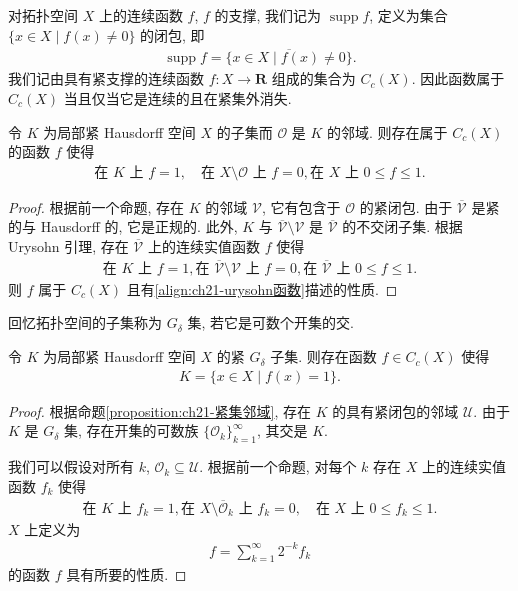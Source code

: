 \documentclass[../../main.tex]{subfiles}
\begin{document}
对拓扑空间 $X$ 上的连续函数 $f$, $f$ 的支撑, 我们记为 $\operatorname{supp}f$, 定义为集合 $\{x\in X\mid f(x)\neq 0\}$ 的闭包, 即
\begin{align*}
\operatorname{supp}f=\overline{\{x\in X\mid f(x)\neq 0\}}.
\end{align*}
我们记由具有紧支撑的连续函数 $f:X\to\mathbf{R}$ 组成的集合为 $C_{c}(X)$. 因此函数属于 $C_{c}(X)$ 当且仅当它是连续的且在紧集外消失.

\begin{proposition}\label{proposition:ch21-urysohn变体}
令 $K$ 为局部紧 Hausdorff 空间 $X$ 的子集而 $\mathcal{O}$ 是 $K$ 的邻域. 则存在属于 $C_{c}(X)$ 的函数 $f$ 使得
\begin{align}\label{align:ch21-urysohn函数}
\text{在 }K\text{ 上 }f=1,\quad\text{在 }X\setminus\mathcal{O}\text{ 上 }f=0,\text{在 }X\text{ 上 }0\leqslant f\leqslant 1.
\end{align}
\end{proposition}

\begin{proof}
根据前一个命题, 存在 $K$ 的邻域 $\mathcal{V}$, 它有包含于 $\mathcal{O}$ 的紧闭包. 由于 $\overline{\mathcal{V}}$ 是紧的与 Hausdorff 的, 它是正规的. 此外, $K$ 与 $\overline{\mathcal{V}}\setminus\mathcal{V}$ 是 $\overline{\mathcal{V}}$ 的不交闭子集. 根据 Urysohn 引理, 存在 $\overline{\mathcal{V}}$ 上的连续实值函数 $f$ 使得
\begin{align*}
\text{在 }K\text{ 上 }f=1,\text{在 }\overline{\mathcal{V}}\setminus\mathcal{V}\text{ 上 }f=0,\text{在 }\overline{\mathcal{V}}\text{ 上 }0\leqslant f\leqslant 1.
\end{align*}
则 $f$ 属于 $C_{c}(X)$ 且有\eqref{align:ch21-urysohn函数}描述的性质.
\end{proof}

回忆拓扑空间的子集称为 $G_{\delta}$ 集, 若它是可数个开集的交.

\begin{corollary}\label{corollary:ch21-gdelta函数}
令 $K$ 为局部紧 Hausdorff 空间 $X$ 的紧 $G_{\delta}$ 子集. 则存在函数 $f\in C_{c}(X)$ 使得
\begin{align*}
K=\{x\in X\mid f(x)=1\}.
\end{align*}
\end{corollary}

\begin{proof}
根据命题\cref{proposition:ch21-紧集邻域}, 存在 $K$ 的具有紧闭包的邻域 $\mathcal{U}$. 由于 $K$ 是 $G_{\delta}$ 集, 存在开集的可数族 $\{\mathcal{O}_{k}\}_{k=1}^{\infty}$, 其交是 $K$.

我们可以假设对所有 $k$, $\mathcal{O}_{k}\subseteq\mathcal{U}$. 根据前一个命题, 对每个 $k$ 存在 $X$ 上的连续实值函数 $f_{k}$ 使得
\begin{align*}
\text{在 }K\text{ 上 }f_{k}=1,\text{在 }X\setminus\overline{\mathcal{O}}_{k}\text{ 上 }f_{k}=0,\quad\text{在 }X\text{ 上 }0\leqslant f_{k}\leqslant 1.
\end{align*}
$X$ 上定义为
\begin{align*}
f=\sum_{k=1}^{\infty}2^{-k}f_{k}
\end{align*}
的函数 $f$ 具有所要的性质.
\end{proof}
\end{document}

